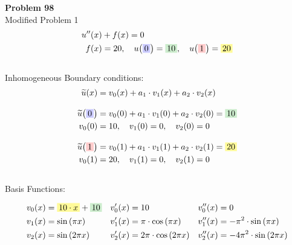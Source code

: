 \documentclass[
final,
a4paper,
oneside,
parskip=full,
headings=standardclasses,
headings=big,
pointednumbers,
fleqn
]{scrartcl}
\newcommand{\tfillb}[1]{\tfillc[#1][blue!20]}
\newcommand{\tfillg}[1]{\tfillc[#1][Green!20]}
\newcommand{\tfilly}[1]{\tfillc[#1][yellow!40]}
\newcommand{\tfillr}[1]{\tfillc[#1][red!20]}
\newcommand{\kl}[1]{{\left( #1 \right)}}
\begin{document}
    {\bf{Problem 98}} \\
    Modified Problem 1 \\
    {\setlength{\abovedisplayskip}{-12pt}
    \setlength{\belowdisplayskip}{-6pt}
    \begin{align*}
    u''\kl{x} &+ f\kl{x} = 0 \\
    f\kl{x} &= 20, \quad u\kl{\tfillb{$0$}} = \tfillg{$10$} , \quad u\kl{\tfillr{$1$}} = \tfilly{$20$}
    \end{align*}} \\
    Inhomogeneous Boundary conditions: \\
    {\setlength{\abovedisplayskip}{-12pt}
    \setlength{\belowdisplayskip}{-22pt}
    \begin{align*}
    \widetilde{u}\kl{x} & = v_0\kl{x} + a_1 \cdot v_1\kl{x} + a_2 \cdot v_2\kl{x} \\[0.3cm]
    \widetilde{u}\kl{\tfillb{$0$}} & = v_0\kl{0} + a_1 \cdot v_1\kl{0} + a_2 \cdot v_2\kl{0} = \tfillg{$10$}\\
    v_0\kl{0} &= 10, \quad v_1\kl{0} = 0, \quad v_2\kl{0} = 0\\[0.3cm]
    \widetilde{u}\kl{\tfillr{$1$}} & = v_0\kl{1} + a_1 \cdot v_1\kl{1} + a_2 \cdot v_2\kl{1} = \tfilly{$20$}\\
    v_0\kl{1} &= 20, \quad v_1\kl{1} = 0, \quad v_2\kl{1} = 0\\
    \end{align*}} \\
    Basis Functions: \\
    \begin{minipage}{0.6\textwidth}
        \setlength{\abovedisplayskip}{0pt}
        \setlength{\belowdisplayskip}{-12pt}
        \begin{align*}
        v_0\kl{x} &= \tfilly{$10 \cdot x$} + \tfillg{$10$}    &v_0'\kl{x} &= 10                            &v_0''\kl{x} &= 0 \\
        v_1\kl{x} &= \sin\kl{\pi x}     &v_1'\kl{x} &= \pi \cdot \cos\kl{\pi x}      &v_1''\kl{x} &= -\pi^2 \cdot \sin\kl{\pi x}\\
        v_2\kl{x} &= \sin\kl{2 \pi x}   &v_2'\kl{x} &= 2 \pi \cdot \cos\kl{2 \pi x}  &v_2''\kl{x} &= -4 \pi^2 \cdot \sin\kl{2 \pi x}
        \end{align*}
    \end{minipage}
\end{document}
